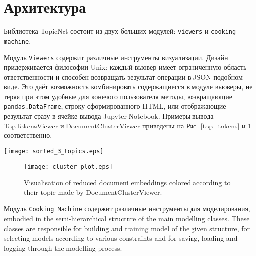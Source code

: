 \section{Архитектура}

Библиотека TopicNet состоит из двух больших модулей: \texttt{viewers} и \texttt{cooking machine}. 

Модуль \texttt{Viewers} содержит различные инструменты визуализации. Дизайн придерживается философии Unix: каждый вьювер имеет ограниченную область ответственности и способен возвращать результат операции в JSON-подобном виде. 
Это даёт возможность комбинировать содержащиесся в модуле вьюверы, не теряя при этом удобные для конечого пользователя методы, возвращающие \texttt{pandas.DataFrame}, строку сформированного HTML, или отображающие результат сразу в ячейке вывода Jupyter Notebook. Примеры вывода TopTokensViewer и DocumentClusterViewer приведены на Рис. \ref{top_tokens} и \ref{documents_clusters} соответственно.

\begin{figure*}[h]
    \centering
    \texttt{[image: sorted\_3\_topics.eps]}
    \caption{Output of the TopTokensViewer. Token score in the topic is calculated for every token, score function can be specified at the stage of a viewer initialization.}
\label{top_tokens}
\end{figure*}

\begin{figure}[h]
    \centering
    \texttt{[image: cluster\_plot.eps]}
    \caption{Visualisation of reduced document embeddings colored according to their topic made by DocumentClusterViewer.}
\label{documents_clusters}
\end{figure}



Модуль \texttt{Cooking Machine} содержит различные инструменты для моделирования, 
embodied in the semi-hierarchical structure of the main modelling classes. 
These classes are responsible for building and training model of the given structure, for selecting models according to various constraints and for saving, loading and logging through the modelling process.

